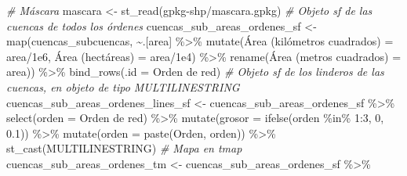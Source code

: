 \documentclass[spanish]{article}
\newenvironment{Shaded}{\begin{snugshade}}{\end{snugshade}}
\newcommand{\AttributeTok}[1]{\textcolor[rgb]{0.77,0.63,0.00}{#1}}
\newcommand{\CommentTok}[1]{\textcolor[rgb]{0.56,0.35,0.01}{\textit{#1}}}
\newcommand{\DecValTok}[1]{\textcolor[rgb]{0.00,0.00,0.81}{#1}}
\newcommand{\FloatTok}[1]{\textcolor[rgb]{0.00,0.00,0.81}{#1}}
\newcommand{\FunctionTok}[1]{\textcolor[rgb]{0.00,0.00,0.00}{#1}}
\newcommand{\NormalTok}[1]{#1}
\newcommand{\OtherTok}[1]{\textcolor[rgb]{0.56,0.35,0.01}{#1}}
\newcommand{\SpecialCharTok}[1]{\textcolor[rgb]{0.00,0.00,0.00}{#1}}
\newcommand{\StringTok}[1]{\textcolor[rgb]{0.31,0.60,0.02}{#1}}
\begin{document}
\begin{Shaded}
\begin{Highlighting}[]
\CommentTok{\# Máscara}
\NormalTok{mascara }\OtherTok{\textless{}{-}} \FunctionTok{st\_read}\NormalTok{(}\StringTok{\textquotesingle{}gpkg{-}shp/mascara.gpkg\textquotesingle{}}\NormalTok{)}
\CommentTok{\# Objeto sf de las cuencas de todos los órdenes}
\NormalTok{cuencas\_sub\_areas\_ordenes\_sf }\OtherTok{\textless{}{-}} \FunctionTok{map}\NormalTok{(cuencas\_subcuencas, }\SpecialCharTok{\textasciitilde{}}\NormalTok{.[}\StringTok{\textquotesingle{}area\textquotesingle{}}\NormalTok{] }\SpecialCharTok{\%\textgreater{}\%}
                           \FunctionTok{mutate}\NormalTok{(}\StringTok{\textasciigrave{}}\AttributeTok{Área (kilómetros cuadrados)}\StringTok{\textasciigrave{}} \OtherTok{=}\NormalTok{ area}\SpecialCharTok{/}\FloatTok{1e6}\NormalTok{,}
                                  \StringTok{\textasciigrave{}}\AttributeTok{Área (hectáreas)}\StringTok{\textasciigrave{}} \OtherTok{=}\NormalTok{ area}\SpecialCharTok{/}\FloatTok{1e4}\NormalTok{) }\SpecialCharTok{\%\textgreater{}\%} 
                           \FunctionTok{rename}\NormalTok{(}\StringTok{\textasciigrave{}}\AttributeTok{Área (metros cuadrados)}\StringTok{\textasciigrave{}} \OtherTok{=}\NormalTok{ area)) }\SpecialCharTok{\%\textgreater{}\%} 
  \FunctionTok{bind\_rows}\NormalTok{(}\AttributeTok{.id =} \StringTok{\textquotesingle{}Orden de red\textquotesingle{}}\NormalTok{)}
\CommentTok{\# Objeto sf de los linderos de las cuencas, en objeto de tipo MULTILINESTRING}
\NormalTok{cuencas\_sub\_areas\_ordenes\_lines\_sf }\OtherTok{\textless{}{-}}\NormalTok{ cuencas\_sub\_areas\_ordenes\_sf }\SpecialCharTok{\%\textgreater{}\%} 
  \FunctionTok{select}\NormalTok{(}\AttributeTok{orden =} \StringTok{\textasciigrave{}}\AttributeTok{Orden de red}\StringTok{\textasciigrave{}}\NormalTok{) }\SpecialCharTok{\%\textgreater{}\%} 
  \FunctionTok{mutate}\NormalTok{(}\AttributeTok{grosor =} \FunctionTok{ifelse}\NormalTok{(orden }\SpecialCharTok{\%in\%} \DecValTok{1}\SpecialCharTok{:}\DecValTok{3}\NormalTok{, }\DecValTok{0}\NormalTok{, }\FloatTok{0.1}\NormalTok{)) }\SpecialCharTok{\%\textgreater{}\%} 
  \FunctionTok{mutate}\NormalTok{(}\AttributeTok{orden =} \FunctionTok{paste}\NormalTok{(}\StringTok{\textquotesingle{}Orden\textquotesingle{}}\NormalTok{, orden)) }\SpecialCharTok{\%\textgreater{}\%} 
  \FunctionTok{st\_cast}\NormalTok{(}\StringTok{\textquotesingle{}MULTILINESTRING\textquotesingle{}}\NormalTok{)}
\CommentTok{\# Mapa en tmap}
\NormalTok{cuencas\_sub\_areas\_ordenes\_tm }\OtherTok{\textless{}{-}}\NormalTok{ cuencas\_sub\_areas\_ordenes\_sf }\SpecialCharTok{\%\textgreater{}\%}

\end{Highlighting}
\end{Shaded}
\end{document}

